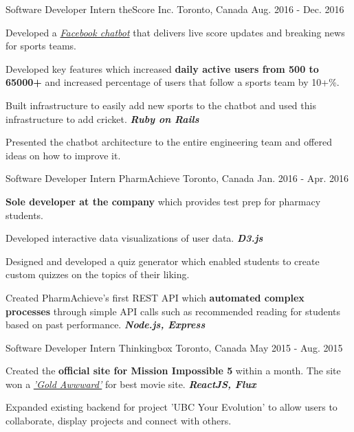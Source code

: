 \begin{cventries}
\cventry
    {Software Developer Intern}
    {theScore Inc.}
    {Toronto, Canada}
    {Aug. 2016 -  Dec. 2016}
    {
      \begin{cvitems}
        \item {Developed a \textit{\href{http://www.m.me/thescore}{Facebook chatbot}} that delivers live score updates and breaking news for sports teams.}
       \item {Developed key features which increased \textbf{daily active users from 500 to 65000+} and increased percentage of users that follow a sports team by 10+\%.}
        \item {Built infrastructure to easily add new sports to the chatbot and used this infrastructure to add cricket. \textit{\textbf{Ruby on Rails}}}
        \item {Presented the chatbot architecture to the entire engineering team and offered ideas on how to improve it.}
      \end{cvitems}
    }
  \cventry
    {Software Developer Intern}
    {PharmAchieve}
    {Toronto, Canada}
    {Jan. 2016 -  Apr. 2016}
    {
      \begin{cvitems}
        \item {\textbf{Sole developer at the company} which provides test prep for pharmacy students.}
        \item {Developed interactive data visualizations of user data. \textit{\textbf{D3.js}}}
        \item {Designed and developed a quiz generator which enabled students to create custom quizzes on the topics of their liking. }
        \item {Created PharmAchieve's first REST API which \textbf{automated complex processes} through simple API calls such as recommended reading for students based on past performance. \textit{\textbf{Node.js, Express}} }
      \end{cvitems}
    }
  \cventry
    {Software Developer Intern}
    {Thinkingbox}
    {Toronto, Canada}
    {May 2015 - Aug. 2015}
    {
      \begin{cvitems}
        \item {Created the \textbf{official site for Mission Impossible 5} within a month. The site won a \textit{\href{https://www.w3award.com/winners/list/view/?event=31&award=1&_p=8}{'Gold Awwward'}} for best movie site. \textit{\textbf{ReactJS, Flux}}}
        \item {Expanded existing backend for project 'UBC Your Evolution' to allow users to collaborate, display projects and connect with others.}

\end{cvitems}}
\end{cventries}
